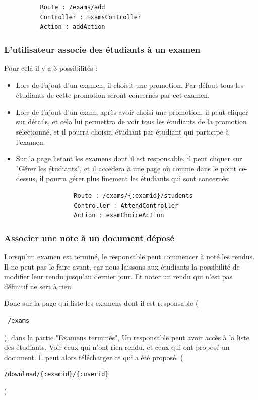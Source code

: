 \documentclass{report}
\begin{document}
        \begin{verbatim}
          Route : /exams/add
          Controller : ExamsController
          Action : addAction
        \end{verbatim}
      \subsubsection{L'utilisateur associe des étudiants à un examen}
        Pour celà il y a 3 possibilités :
        \begin{itemize}
          \item{
              Lors de l'ajout d'un examen, il choisit une promotion. Par défaut
              tous les étudiants de cette promotion seront concernés par cet
              examen.
            }
          \item{
              Lors de l'ajout d'un exam, après avoir choisi une promotion, il peut
              cliquer sur détails, et cela lui permettra de voir tous les étudiants
              de la promotion sélectionné, et il pourra choisir, étudiant par
              étudiant qui participe à l'examen.
            }
          \item{
              Sur la page listant les examens dont il est responsable, il peut
              cliquer sur "Gérer les étudiants", et il accèdera à une page où
              comme dans le point ce-dessus, il pourra gérer plus finement les
              étudiants qui sont concernés:
              \vspace{1em}
              \begin{verbatim}
                Route : /exams/{:examid}/students
                Controller : AttendController
                Action : examChoiceAction
              \end{verbatim}
            }
        \end{itemize}
      \subsubsection{Associer une note à un document déposé}
        Lorsqu'un examen est terminé, le responsable peut commencer à noté les rendus.
        Il ne peut pas le faire avant, car nous laissons aux étudiants la possibilité
        de modifier leur rendu jusqu'au dernier jour. Et noter un rendu qui n'est pas
        définitif ne sert à rien.

        Donc sur la page qui liste les examens dont il est responsable (
        \begin{verbatim} /exams \end{verbatim}), dans la partie "Examens terminés",
        Un responsable peut avoir accès à la liste des étudiants. Voir ceux qui
        n'ont rien rendu, et ceux qui ont proposé un document. Il peut alors
        télécharger ce qui a été proposé. 
        (\begin{verbatim}/download/{:examid}/{:userid}\end{verbatim})
\end{document}

